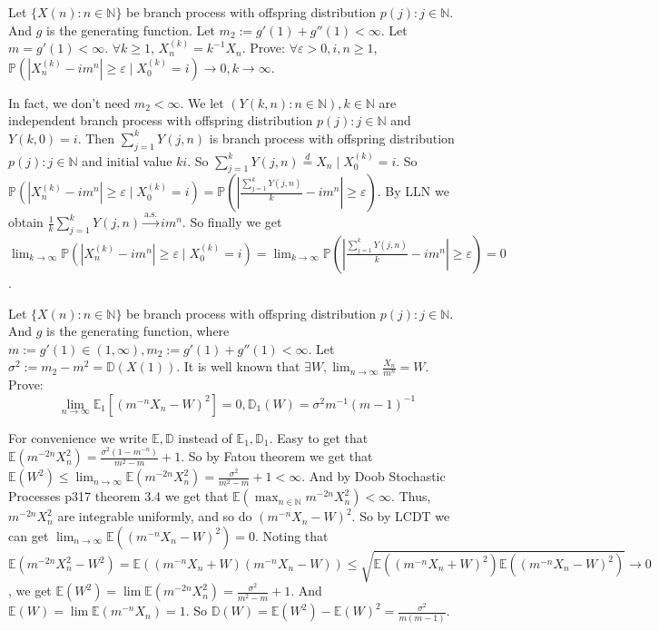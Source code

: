 \documentclass{ctexart}
\begin{document}
\begin{problem}\label{pro:3}
  Let \(\{X(n): n \in \mathbb{N}\}\) be branch process with offspring distribution \(p(j): j \in \mathbb{N}\).
  And \(g\) is the generating function. Let \(m_2:=g'(1) + g''(1) < \infty\).
  Let \(m=g'(1)<\infty\).
  \(\forall k \geq 1\), \(X_n^{(k)}=k^{-1}X_n\).
  Prove: \(\forall \varepsilon >0, i,n \geq 1\), \(\mathbb{P}(|X_n^{(k)} -im^n| \geq \varepsilon \mid X_0^{(k)}=i) \to 0, k \to \infty\).
\end{problem}
\begin{solution}
  In fact, we don't need \(m_2<\infty\).
  We let \((Y(k,n):n \in \mathbb{N}),k \in \mathbb{N}\) are independent branch process with offspring distribution \(p(j):j \in \mathbb{N}\) and \(Y(k,0)=i\).
  Then \(\sum_{j=1}^{k} Y(j,n)\) is branch process with offspring distribution \(p(j):j \in \mathbb{N}\) and initial value \(ki\).
  So \(\sum_{j=1}^{k} Y(j,n) \overset{d}{=} X_n \mid X_0^{(k)}=i\).
  So \(\mathbb{P}(|X_n^{(k)}-im^n|\geq \varepsilon \mid X_0^{(k)}=i)=\mathbb{P}(|\frac{\sum_{j=1}^{k} Y(j,n)}{k}-im^n| \geq \varepsilon)\).
  By LLN we obtain \(\frac{1}{k}\sum_{j=1}^{k} Y(j,n)\overset{\text{a.s.}}{\to} im^n\).
  So finally we get \(\lim_{k \to \infty}\mathbb{P}(|X_n^{(k)}-im^n|\geq \varepsilon \mid X_0^{(k)}=i)=\lim_{k \to \infty}\mathbb{P}(|\frac{\sum_{j=1}^{k} Y(j,n)}{k}-im^n| \geq \varepsilon)=0\).
\end{solution}

\begin{problem}\label{pro:4}
  Let \(\{X(n): n \in \mathbb{N}\}\) be branch process with offspring distribution \(p(j): j \in \mathbb{N}\).
  And \(g\) is the generating function, where \(m :=g' (1) \in (1, \infty), m_2:=g'(1) + g''(1) < \infty\).
  Let \(\sigma^2:=m_2-m^2 = \mathbb{D}(X(1))\).
  It is well known that \(\exists W,\lim_{n \to \infty}\frac{X_n}{m^n} = W\).
  Prove: \[
    \lim_{n \to \infty}\mathbb{E}_1[(m^{-n}X_n -W)^2]= 0, \mathbb{D}_1(W)=\sigma^2 m^{-1}(m-1)^{-1}
  \]
\end{problem}
\begin{solution}
  For convenience we write \(\mathbb{E},\mathbb{D}\) instead of \(\mathbb{E}_1,\mathbb{D}_1\).
  Easy to get that \(\mathbb{E}(m ^{-2n} X_n^2)=\frac{\sigma^2(1-m^{-n})}{m^2-m}+1\).
  So by Fatou theorem we get that \(\mathbb{E}(W^2) \leq \lim_{n \to \infty}\mathbb{E}(m^{-2n}X_n^2)=\frac{\sigma^2}{m^2-m}+1<\infty\).
  And by Doob Stochastic Processes p317 theorem 3.4 we get that
  \(\mathbb{E}(\max_{n \in \mathbb{N}}m^{-2n}X_n^2) < \infty\).
  Thus, \(m^{-2n}X_n^2\) are integrable uniformly, and so do \((m^{-n}X_n-W)^2\).
  So by LCDT we can get \(\lim_{n \to \infty}\mathbb{E}((m^{-n}X_n-W)^2)=0\).
  Noting that
  \[
    \mathbb{E}(m^{-2n}X_n^2-W^2)=\mathbb{E}((m^{-n}X_n+W)(m^{-n}X_n-W)) \leq \sqrt{\mathbb{E}((m^{-n}X_n+W)^2) \mathbb{E}((m^{-n}X_n-W)^2)} \to 0
  \]
  ,
  we get \(\mathbb{E}(W^2)=\lim \mathbb{E}(m^{-2n}X_n^2)=\frac{\sigma^2}{m^2-m}+1\).
  And \(\mathbb{E}(W)=\lim \mathbb{E}(m^{-n}X_n)=1\).
  So \(\mathbb{D}(W)=\mathbb{E}(W^2)-\mathbb{E}(W)^2=\frac{\sigma^2}{m(m-1)}\).
\end{solution}
\end{document}
